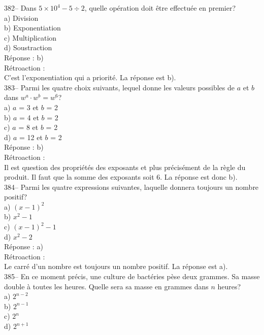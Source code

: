 ﻿\documentclass[letterpaper, 12pt]{article}
\begin{document}
382-- Dans $5\times10^{4}-5\div2$, quelle op\'eration doit \^etre
effectu\'ee en premier?\\
a) Division\\
b) Exponentiation\\
c) Multiplication\\
d) Soustraction\\

R\'eponse : b)\\

R\'etroaction : \\
C'est l'exponentiation qui a priorit\'e.  La r\'eponse est b).\\

383-- Parmi les quatre choix suivants, lequel donne les valeurs possibles de
$a$ et $b$ dans $w^{a}\cdot w^{b}=w^{6}$?\\
a) $a$ = 3 et $b$ = 2\\
b) $a$ = 4 et $b$ = 2\\
c) $a$ = 8 et $b$ = 2\\
d) $a$ = 12 et $b$ = 2\\

R\'eponse : b) \\

R\'etroaction : \\
Il est question des propri\'et\'es des exposants et plus pr\'ecis\'ement de
la r\`egle du produit.  Il faut que la somme des exposants soit 6.  La
r\'eponse est donc b).\\


384-- Parmi les quatre expressions suivantes, laquelle donnera toujours un
nombre positif?\\
a) $\left( x-1\right) ^2$\\
b) $x^{2}-1$\\
c) $\left( x-1\right) ^2-1$\\
d)  $x^{2}-2$\\

R\'eponse : a)\\

R\'etroaction : \\
Le carr\'e d'un nombre est toujours un nombre positif. La r\'eponse est
a).\\

385-- En ce moment pr\'ecis, une culture de bact\'eries p\`ese deux grammes.
  Sa masse double \`a toutes les heures.  Quelle sera sa masse en grammes
dans $n$ heures?\\
a) $2^{n-2}$\\
b) $2^{n-1}$\\
c) $2^{n}$\\
d) $2^{n+1}$\\
\end{document}
